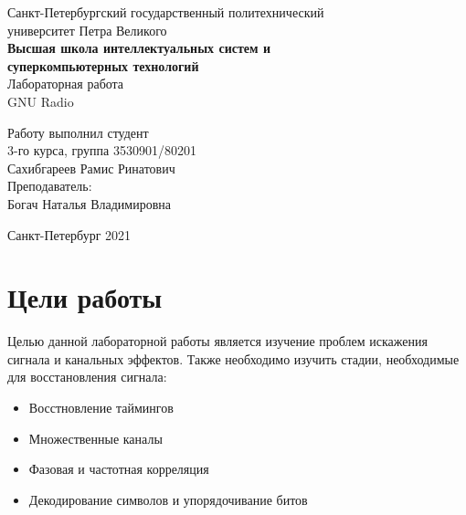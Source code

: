 \documentclass[a4paper]{article}
\begin{document}
    \begin{center}
        \begin{center}
        \hfill \break
        \normalsize{Санкт-Петербургский государственный политехнический}\\
        \normalsize{университет Петра Великого}\\
        \hfill \break
        \normalsize{\textbf{Высшая школа интеллектуальных систем и}}\\ 
        \normalsize{\textbf{суперкомпьютерных технологий}}\\ 
        \hfill \break
        \hfill \break
        \hfill \break
        \normalsize{Лабораторная работа}\\
        \hfill \break
        \hfill \break
        \normalsize{\LARGE GNU Radio}\\
        \end{center}
        \hfill \break
        \hfill \break
        \hfill \break
        \hfill \break
        \hfill \break
        \hfill \break
        \hfill \break
        \hfill \break
        \hfill \break
        \hfill \break
        \begin{flushright}
            \normalsize{Работу выполнил студент}\\
            \normalsize{3-го курса, группа 3530901/80201}\\
            \normalsize{Сахибгареев Рамис Ринатович}\\
            \hfill \break
            \normalsize{Преподаватель:}\\
            \normalsize{Богач Наталья Владимировна}\\
        \end{flushright}
        \hfill \break
        \hfill \break
        \hfill \break
        \hfill \break
        \begin{center} Санкт-Петербург 2021 \end{center}
        \thispagestyle{empty}
    \end{center}
    
    \newpage
        \tableofcontents
    
    \newpage
         \listoffigures
     
    \newpage
        \section{Цели работы}
            Целью данной лабораторной работы является изучение проблем искажения сигнала и канальных эффектов. Также необходимо изучить стадии, необходимые для восстановления сигнала:
            \begin{itemize}
                \item Восстновление таймингов
                \item Множественные каналы
                \item Фазовая и частотная корреляция
                \item Декодирование символов и упорядочивание битов
            \end{itemize}
            
\end{document}
